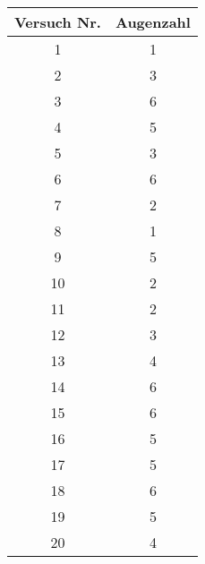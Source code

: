 \documentclass[12pt,a4paper]{article}
\begin{document}
    \begin{table}[h]
        \begin{tabular}[h]{*{2}{c}}
            \hline
            Versuch Nr. & Augenzahl \\
            \hline
            1 & 1 \\
            2 & 3 \\
            3 & 6 \\
            4 & 5 \\
            5 & 3 \\
            6 & 6 \\
            7 & 2 \\
            8 & 1 \\
            9 & 5 \\
            10 & 2 \\
            11 & 2 \\
            12 & 3 \\
            13 & 4 \\
            14 & 6 \\
            15 & 6 \\
            16 & 5 \\
            17 & 5 \\
            18 & 6 \\
            19 & 5 \\
            20 & 4 \\
        \end{tabular}


\end{table}
\end{document}
